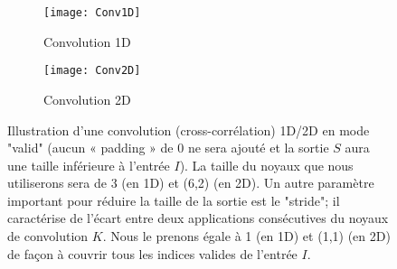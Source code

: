 \begin{figure}[!h]
\begin{subfigure}{.5\textwidth}
  \centering
  \texttt{[image: Conv1D]}  
  \caption[Conv1D]{Convolution 1D \parencite{Reference10}}
\end{subfigure}
\begin{subfigure}{.5\textwidth}
  \centering
  \texttt{[image: Conv2D]}  
  \caption[Conv2D]{Convolution 2D \parencite{Reference11}}
\end{subfigure}
\label{fig:Conv1D2D}

\centering
\decoRule
\caption[Convolution1D2D]{Illustration d'une convolution (cross-corrélation) 1D/2D en mode "valid" (aucun « padding » de 0 ne sera ajouté et la sortie $S$ aura une taille inférieure à l'entrée $I$). La taille du noyaux que nous utiliserons sera de 3 (en 1D) et (6,2) (en 2D). Un autre paramètre important pour réduire la taille de la sortie est le "stride"; il caractérise de l'écart entre deux applications consécutives du noyaux de convolution $K$. Nous le prenons égale à 1 (en 1D) et (1,1) (en 2D) de façon à couvrir tous les indices valides de l'entrée $I$.}
\end{figure}

% 


